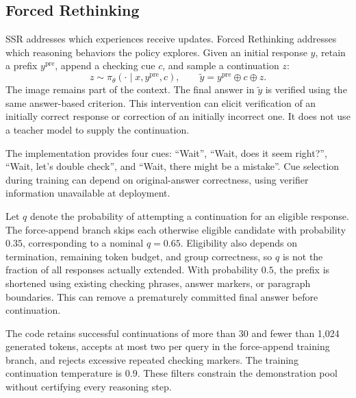 \documentclass[10pt,twocolumn]{article}
\begin{document}
\subsection{Forced Rethinking}
\label{sec:rethink}
SSR addresses which experiences receive updates. Forced Rethinking addresses which reasoning behaviors the policy explores. Given an initial response $y$, retain a prefix $y^{\mathrm{pre}}$, append a checking cue $c$, and sample a continuation $z$:
\begin{equation}
 z\sim\pi_\theta(\cdot\mid x,y^{\mathrm{pre}},c),\qquad
 \tilde y=y^{\mathrm{pre}}\oplus c\oplus z.
 \label{eq:rethink}
\end{equation}
The image remains part of the context. The final answer in $\tilde y$ is verified using the same answer-based criterion. This intervention can elicit verification of an initially correct response or correction of an initially incorrect one. It does not use a teacher model to supply the continuation.

The implementation provides four cues: ``Wait'', ``Wait, does it seem right?'', ``Wait, let's double check'', and ``Wait, there might be a mistake''. Cue selection during training can depend on original-answer correctness, using verifier information unavailable at deployment.

Let $q$ denote the probability of attempting a continuation for an eligible response. The force-append branch skips each otherwise eligible candidate with probability $0.35$, corresponding to a nominal $q=0.65$. Eligibility also depends on termination, remaining token budget, and group correctness, so $q$ is not the fraction of all responses actually extended. With probability $0.5$, the prefix is shortened using existing checking phrases, answer markers, or paragraph boundaries. This can remove a prematurely committed final answer before continuation.

The code retains successful continuations of more than 30 and fewer than 1,024 generated tokens, accepts at most two per query in the force-append training branch, and rejects excessive repeated checking markers. The training continuation temperature is $0.9$. These filters constrain the demonstration pool without certifying every reasoning step.
\end{document}
